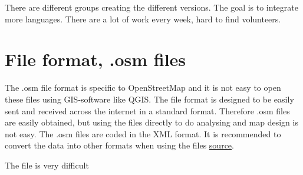 There are different groups creating the different versions. The goal is to integrate more languages. There are a lot of work every week, hard to find volunteers. 


 \section{File format, .osm files}
The .osm file format is specific to OpenStreetMap and it is not easy to open these files using GIS-software like QGIS. The file format is designed to be easily sent and received across the internet in a standard format. Therefore .osm files are easily obtained, but using the files directly to do analysing and map design is not easy. The .osm files are coded in the XML format. It is recommended to convert the data into other formats when using the files \href{http://learnosm.org/en/osm-data/file-formats/}{source}. 

The file is very difficult








 